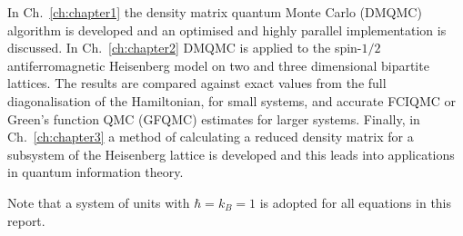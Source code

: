 In Ch.~\ref{ch:chapter1} the density matrix quantum Monte Carlo (DMQMC) algorithm is developed and an optimised and highly parallel implementation is discussed. In Ch.~\ref{ch:chapter2} DMQMC is applied to the spin-$1/2$ antiferromagnetic Heisenberg model on two and three dimensional bipartite lattices. The results are compared against exact values from the full diagonalisation of the Hamiltonian, for small systems, and accurate FCIQMC or Green's function QMC (GFQMC) estimates for larger systems. Finally, in Ch.~\ref{ch:chapter3} a method of calculating a reduced density matrix for a subsystem of the Heisenberg lattice is developed and this leads into applications in quantum information theory.

Note that a system of units with $\hbar = k_B = 1$ is adopted for all equations in this report.



